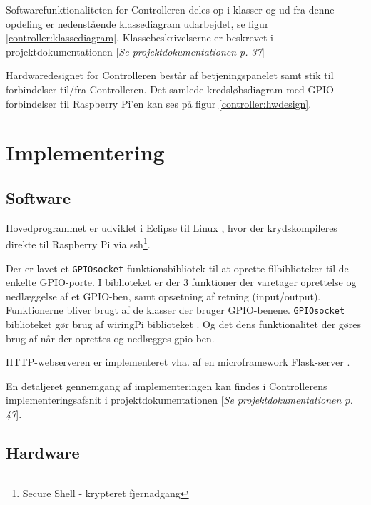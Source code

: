 Softwarefunktionaliteten for Controlleren deles op i klasser og ud fra denne opdeling er nedenstående klassediagram udarbejdet, se figur \ref{controller:klassediagram}. Klassebeskrivelserne er beskrevet i projektdokumentationen [\textit{Se projektdokumentationen p. 37}]


Hardwaredesignet for Controlleren består af betjeningspanelet samt stik til forbindelser til/fra Controlleren. Det samlede kredsløbsdiagram med GPIO-forbindelser til Raspberry Pi'en kan ses på figur \ref{controller:hwdesign}.


\section{Implementering}
\label{ctrl_implementering}

\subsection*{Software}

Hovedprogrammet er udviklet i Eclipse til Linux \citep{website:eclipsekepler}, hvor der krydskompileres direkte til Raspberry Pi via ssh\footnote{Secure Shell - krypteret fjernadgang}.

Der er lavet et \verb+GPIOsocket+ funktionsbibliotek til at oprette filbiblioteker til de enkelte GPIO-porte. I biblioteket er der 3 funktioner der varetager oprettelse og nedlæggelse af et GPIO-ben, samt opsætning af retning (input/output). Funktionerne bliver brugt af de klasser der bruger GPIO-benene. \verb+GPIOsocket+ biblioteket gør brug af wiringPi biblioteket \citep{website:wiringpi}. Og det dens funktionalitet der gøres brug af når der oprettes og nedlægges gpio-ben.

HTTP-webserveren er implementeret vha. af en microframework Flask-server \citep{website:flask}.

En detaljeret gennemgang af implementeringen kan findes i Controllerens implementeringsafsnit i projektdokumentationen [\textit{Se projektdokumentationen p. 47}].

\subsection*{Hardware}

